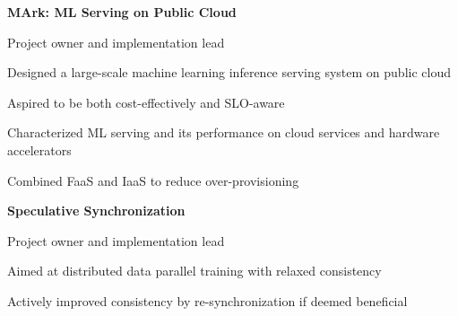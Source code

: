 \documentclass[11pt]{article}
\begin{document}

\textbf{MArk: ML Serving on Public Cloud}
\begin{compactenum}[-]
\item Project owner and implementation lead
\item Designed a large-scale machine learning inference serving system on public cloud
\item Aspired to be both cost-effectively and SLO-aware
\item Characterized ML serving and its performance on cloud services and hardware accelerators
\item Combined FaaS and IaaS to reduce over-provisioning
\end{compactenum}
\vspace{5pt}

\textbf{Speculative Synchronization}
\begin{compactenum}[-]
\item Project owner and implementation lead
\item Aimed at distributed data parallel training with relaxed consistency
\item Actively improved consistency by re-synchronization if deemed beneficial
\end{compactenum}
\end{document}
